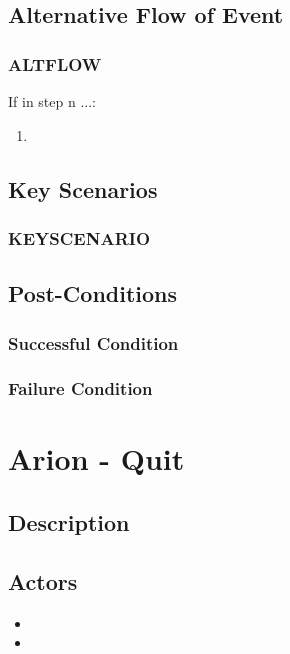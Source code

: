 \documentclass{scrreprt}
\begin{document}
\section{Alternative Flow of Event}

    \subsection{ALTFLOW}
    If in step n ...:
    \begin{enumerate}
        \item 
    \end{enumerate}

\section{Key Scenarios}
    \subsection{KEYSCENARIO}

\section{Post-Conditions}
    \subsection{Successful Condition}
    
    \subsection{Failure Condition}


\chapter{Arion - Quit}

\section{Description}

\section{Actors}
\begin{itemize}
    \item 
    \item 
\end{itemize}
\end{document}
